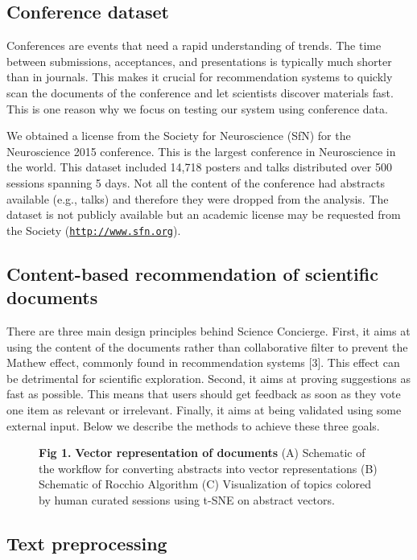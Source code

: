 \documentclass[a4paper]{article}
\begin{document}
\subsection{Conference dataset}

Conferences are events that need a rapid understanding of trends. The time between submissions, acceptances, and presentations is typically much shorter than in journals. This makes it crucial for recommendation systems to quickly scan the documents of the conference and let scientists discover materials fast. This is one reason why we focus on testing our system using conference data.


We obtained a license from the Society for Neuroscience (SfN) for the Neuroscience 2015 conference. This is the largest conference in Neuroscience in the world. This dataset included 14,718 posters and talks distributed over 500 sessions spanning 5 days. Not all the content of the conference had abstracts available (e.g., talks) and therefore they were dropped from the analysis. The dataset is not publicly available but an academic license may be requested from the Society (\href{https://www.sfn.org}{\texttt{http://www.sfn.org}}).


\subsection{Content-based recommendation of scientific documents}


There are three main design principles behind Science Concierge. First, it aims at using the content of the documents rather than collaborative filter to prevent the Mathew effect, commonly found in recommendation systems [3]. This effect can be detrimental for scientific exploration. Second, it aims at proving suggestions as fast as possible. This means that users should get feedback as soon as they vote one item as relevant or irrelevant. Finally, it aims at being validated using some external input. Below we describe the methods to achieve these three goals.


\begin{figure}[!ht]
\textbf{Fig 1.} \textbf{Vector representation of documents} (A) Schematic of the workflow for converting abstracts into vector representations (B) Schematic of Rocchio Algorithm (C) Visualization of topics colored by human curated sessions using t-SNE on abstract vectors.
\end{figure}


\subsection{Text preprocessing}
\end{document}
